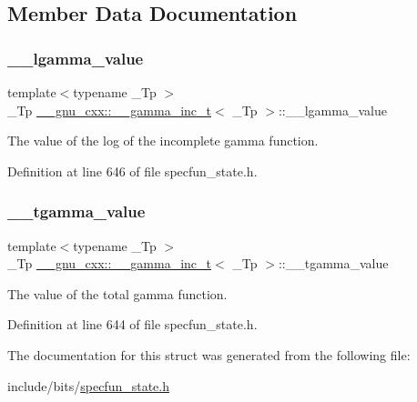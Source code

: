 \subsection{Member Data Documentation}
\mbox{\label{struct____gnu__cxx_1_1____gamma__inc__t_a193b3f7871e371363571fe90b1ce1767}} 
\subsubsection{\texorpdfstring{\+\_\+\+\_\+lgamma\+\_\+value}{\_\_lgamma\_value}}
{\footnotesize\ttfamily template$<$typename \+\_\+\+Tp $>$ \\
\+\_\+\+Tp \hyperlink{struct____gnu__cxx_1_1____gamma__inc__t}{\+\_\+\+\_\+gnu\+\_\+cxx\+::\+\_\+\+\_\+gamma\+\_\+inc\+\_\+t}$<$ \+\_\+\+Tp $>$\+::\+\_\+\+\_\+lgamma\+\_\+value}



The value of the log of the incomplete gamma function. 



Definition at line 646 of file specfun\+\_\+state.\+h.

\mbox{\label{struct____gnu__cxx_1_1____gamma__inc__t_a53d4ffc984c6685ce328caff424b5fe4}} 
\subsubsection{\texorpdfstring{\+\_\+\+\_\+tgamma\+\_\+value}{\_\_tgamma\_value}}
{\footnotesize\ttfamily template$<$typename \+\_\+\+Tp $>$ \\
\+\_\+\+Tp \hyperlink{struct____gnu__cxx_1_1____gamma__inc__t}{\+\_\+\+\_\+gnu\+\_\+cxx\+::\+\_\+\+\_\+gamma\+\_\+inc\+\_\+t}$<$ \+\_\+\+Tp $>$\+::\+\_\+\+\_\+tgamma\+\_\+value}



The value of the total gamma function. 



Definition at line 644 of file specfun\+\_\+state.\+h.



The documentation for this struct was generated from the following file\+:\begin{DoxyCompactItemize}
\item 
include/bits/\hyperlink{specfun__state_8h}{specfun\+\_\+state.\+h}\end{DoxyCompactItemize}
